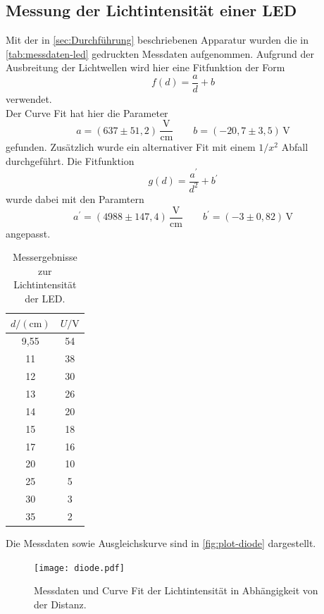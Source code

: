 \subsection{Messung der Lichtintensität einer LED}
\label{sec:Messung der Lichtintensität einer LED}
Mit der in \autoref{sec:Durchführung} beschriebenen Apparatur wurden die in 
\autoref{tab:messdaten-led} gedruckten Messdaten aufgenommen. 
Aufgrund der Ausbreitung der Lichtwellen wird
hier eine Fitfunktion der Form
\begin{equation}
	f(d) = \frac{a}{d} + b
\end{equation}
verwendet.\\
Der Curve Fit hat hier die Parameter
\begin{equation}
	a = (637 \pm 51,2) \, \frac{\si{\volt}}{\si{\centi\meter}}
	\qquad
	b = (-20,7 \pm 3,5) \, \si{\volt}
\end{equation}
gefunden. Zusätzlich wurde ein alternativer Fit mit einem $1 / x^2$ Abfall durchgeführt.
Die Fitfunktion
\begin{equation}
	g(d) = \frac{a^\prime}{d^2} + b^\prime
\end{equation}
wurde dabei mit den Paramtern
\begin{equation}
	a^\prime = (4988 \pm 147,4) \, \frac{\si{\volt}}{\si{\centi\meter}}
	\qquad
	b^\prime = (-3 \pm 0,82) \, \si{\volt}
\end{equation}
angepasst.
\begin{table}
	\centering
	\caption{Messergebnisse zur Lichtintensität der LED.}
	\label{tab:messdaten-led}
	\begin{tabular}{c c}
		\toprule
		$d / (\si{\centi\meter})$ & $U / \si{\volt}$ \\
		\midrule
		9,55         &           54 \\
		11           &           38 \\
		12           &           30 \\
		13           &           26 \\
		14           &           20 \\
		15           &           18 \\
		17           &           16 \\
		20           &           10 \\
		25           &           5  \\
		30           &           3  \\
		35           &           2  \\
		\bottomrule
	\end{tabular}
\end{table}
Die Messdaten sowie Ausgleichskurve sind in \autoref{fig:plot-diode} dargestellt.
\begin{figure}
	\centering
	\texttt{[image: diode.pdf]}
	\caption{Messdaten und Curve Fit der Lichtintensität in Abhängigkeit von der
	Distanz.}
	\label{fig:plot-diode}
\end{figure}
